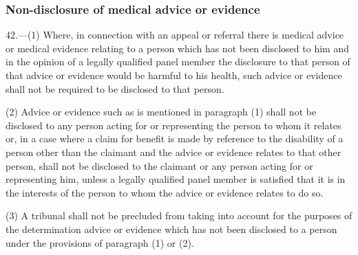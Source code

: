 \documentclass[12pt,a4paper]{article}
\begin{document}

\subsubsection[42. Non-disclosure of medical advice or evidence]{Non-disclosure of medical advice or evidence}

42.—(1) Where, in connection with 
an appeal or referral there is 
medical advice or medical evidence relating to a person which has not been disclosed to him and in the opinion of 
a legally qualified panel member  %
the disclosure to that person of that advice or evidence would be harmful to his health, such advice or evidence shall not be required to be disclosed to that person.

(2) Advice or evidence such as is mentioned in paragraph (1) shall not be disclosed to any person acting for or representing the person to whom it relates or, in a case where a claim for benefit is made by reference to the disability of a person other than the claimant and the advice or evidence relates to that other person, shall not be disclosed to the claimant or any person acting for or representing him, unless 
a legally qualified panel member  %
is satisfied that it is in the interests of the person to whom the advice or evidence relates to do so.

(3) A tribunal shall not be precluded from taking into account for the purposes of the determination advice or evidence which has not been disclosed to a person under the provisions of paragraph (1) or (2).

\end{document}
